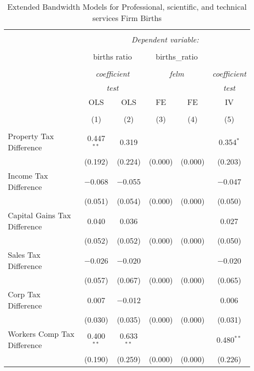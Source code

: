 
\begin{table}[!htbp] \centering 
  \caption{Extended Bandwidth Models for  Professional, scientific, and technical services Firm Births} 
  \label{} 
\begin{tabular}{@{\extracolsep{5pt}}lccccc} 
\\[-1.8ex]\hline 
\hline \\[-1.8ex] 
 & \multicolumn{5}{c}{\textit{Dependent variable:}} \\ 
\cline{2-6} 
\\[-1.8ex] & \multicolumn{2}{c}{births ratio} & \multicolumn{2}{c}{births\_ratio} &   \\ 
\\[-1.8ex] & \multicolumn{2}{c}{\textit{coefficient}} & \multicolumn{2}{c}{\textit{felm}} & \textit{coefficient} \\ 
 & \multicolumn{2}{c}{\textit{test}} & \multicolumn{2}{c}{\textit{}} & \textit{test} \\ 
 & OLS & OLS & FE & FE & IV \\ 
\\[-1.8ex] & (1) & (2) & (3) & (4) & (5)\\ 
\hline \\[-1.8ex] 
 Property Tax Difference & 0.447$^{**}$ & 0.319 &  &  & 0.354$^{*}$ \\ 
  & (0.192) & (0.224) & (0.000) & (0.000) & (0.203) \\ 
  Income Tax Difference & $-$0.068 & $-$0.055 &  &  & $-$0.047 \\ 
  & (0.051) & (0.054) & (0.000) & (0.000) & (0.050) \\ 
  Capital Gains Tax Difference & 0.040 & 0.036 &  &  & 0.027 \\ 
  & (0.052) & (0.052) & (0.000) & (0.000) & (0.050) \\ 
  Sales Tax Difference & $-$0.026 & $-$0.020 &  &  & $-$0.020 \\ 
  & (0.057) & (0.067) & (0.000) & (0.000) & (0.065) \\ 
  Corp Tax Difference & 0.007 & $-$0.012 &  &  & 0.006 \\ 
  & (0.030) & (0.035) & (0.000) & (0.000) & (0.031) \\ 
  Workers Comp Tax Difference & 0.400$^{**}$ & 0.633$^{**}$ &  &  & 0.480$^{**}$ \\ 
  & (0.190) & (0.259) & (0.000) & (0.000) & (0.226) \\ 

\end{tabular}
\end{table}
